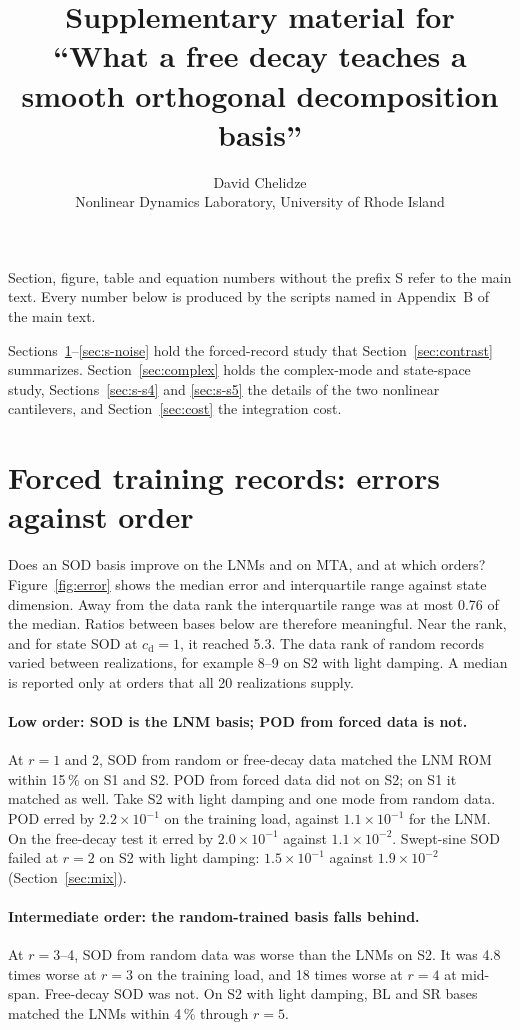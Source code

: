 \documentclass[11pt]{article}
\title{Supplementary material for\\ ``What a free decay teaches a smooth orthogonal decomposition basis''}
\author{David Chelidze\\ Nonlinear Dynamics Laboratory, University of Rhode Island}
\date{}
\begin{document}
\maketitle
\noindent Section, figure, table and equation numbers without the prefix S refer to the main text. Every number below is produced by the scripts named in Appendix~B of the main text.

\noindent Sections~\ref{sec:acc}--\ref{sec:s-noise} hold the forced-record study that Section~\ref{sec:contrast} summarizes. Section~\ref{sec:complex} holds the complex-mode and state-space study, Sections~\ref{sec:s-s4} and \ref{sec:s-s5} the details of the two nonlinear cantilevers, and Section~\ref{sec:cost} the integration cost.

\section{Forced training records: errors against order}\label{sec:acc}
Does an SOD basis improve on the LNMs and on MTA, and at which orders?
Figure~\ref{fig:error} shows the median error and interquartile range against state dimension.
Away from the data rank the interquartile range was at most 0.76 of the median. Ratios between bases below are therefore meaningful. Near the rank, and for state SOD at $c_{\mathrm d}=1$, it reached 5.3.
The data rank of random records varied between realizations, for example 8--9 on S2 with light damping. A median is reported only at orders that all 20 realizations supply.

\paragraph{Low order: SOD is the LNM basis; POD from forced data is not.} At $r=1$ and 2, SOD from random or free-decay data matched the LNM ROM within 15\,\% on S1 and S2.
POD from forced data did not on S2; on S1 it matched as well. Take S2 with light damping and one mode from random data. POD erred by $2.2\times10^{-1}$ on the training load, against $1.1\times10^{-1}$ for the LNM. On the free-decay test it erred by $2.0\times10^{-1}$ against $1.1\times10^{-2}$.
Swept-sine SOD failed at $r=2$ on S2 with light damping: $1.5\times10^{-1}$ against $1.9\times10^{-2}$ (Section~\ref{sec:mix}).

\paragraph{Intermediate order: the random-trained basis falls behind.} At $r=3$--4, SOD from random data was worse than the LNMs on S2. It was 4.8 times worse at $r=3$ on the training load, and 18 times worse at $r=4$ at mid-span.
Free-decay SOD was not. On S2 with light damping, BL and SR bases matched the LNMs within 4\,\% through $r=5$.
\end{document}
